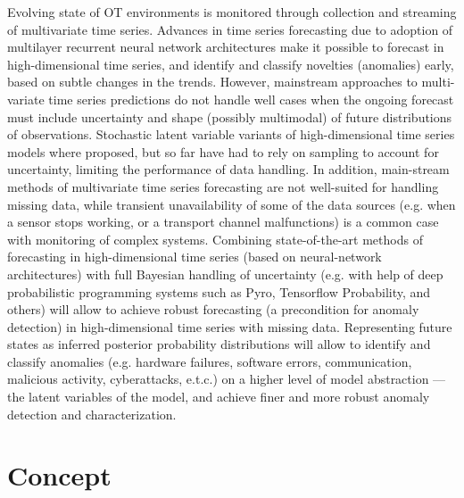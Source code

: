\documentclass[runningheads]{llncs}
\begin{document}
Evolving state of OT environments  is monitored through collection and
streaming of multivariate time series. Advances in time series forecasting due
to adoption of multilayer recurrent neural network architectures make it
possible to forecast in high-dimensional time series, and identify and
classify novelties (anomalies) early, based on subtle changes in the trends.
However, mainstream approaches to multi-variate time series predictions do not
handle well cases when the ongoing forecast must include uncertainty and shape
(possibly multimodal) of future distributions of observations. Stochastic
latent variable variants of high-dimensional time series models where
proposed, but so far have had to rely on sampling to account for uncertainty,
limiting the performance of data handling. In addition, main-stream methods of
multivariate time series forecasting are not well-suited for handling missing
data, while transient unavailability of some of the data sources (e.g. when a
sensor stops working, or a transport channel malfunctions) is  a common case
with monitoring of complex systems.  Combining state-of-the-art methods of
forecasting in high-dimensional time series (based on neural-network
architectures) with full Bayesian handling of uncertainty (e.g. with help of
deep probabilistic programming systems such as Pyro, Tensorflow Probability,
and others) will allow to achieve robust forecasting (a precondition for
anomaly detection) in high-dimensional time series with missing data.
Representing future states as inferred posterior probability distributions
will allow to identify and classify anomalies (e.g. hardware failures,
software errors, communication, malicious activity, cyberattacks, e.t.c.) on a
higher level of model abstraction — the latent variables of the model, and
achieve finer and more robust anomaly detection and characterization.

\section{Concept}
\end{document}
